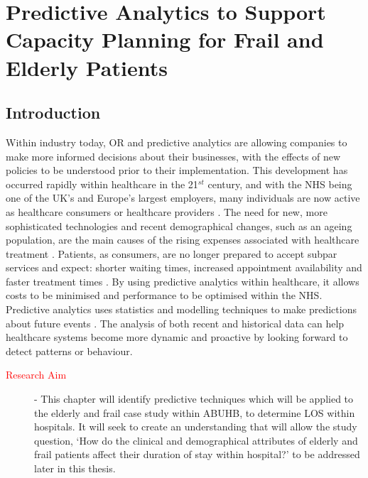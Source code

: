 \documentclass[../thesis.tex]{subfiles}
\begin{document}
\chapter{Predictive Analytics to Support Capacity Planning for Frail and Elderly Patients} \label{chp:predictive}

\section{Introduction}
Within industry today, OR and predictive analytics are allowing companies to make more informed decisions about their businesses, with the effects of new policies to be understood prior to their implementation. This development has occurred rapidly within healthcare in the 21$^{st}$ century, and with the NHS being one of the UK's and Europe's largest employers, many individuals are now active as healthcare consumers or healthcare providers \cite{NHSJobs2022}. The need for new, more sophisticated technologies and recent demographical changes, such as an ageing population, are the main causes of the rising expenses associated with healthcare treatment \cite{ONS2022}. Patients, as consumers, are no longer prepared to accept subpar services and expect: shorter waiting times, increased appointment availability and faster treatment times \cite{Aiken2021}. By using predictive analytics within healthcare, it allows costs to be minimised and performance to be optimised within the NHS. Predictive analytics uses statistics and modelling techniques to make predictions about future events \cite{Kumar2018}. The analysis of both recent and historical data can help healthcare systems become more dynamic and proactive by looking forward to detect patterns or behaviour.
\begin{description}

\item[\textcolor{red}{Research Aim}] - This chapter will identify predictive techniques which will be applied to the elderly and frail case study within ABUHB, to determine LOS within hospitals. It will seek to create an understanding that will allow the study question, `How do the clinical and demographical attributes of elderly and frail patients affect their duration of stay within hospital?' to be addressed later in this thesis. 
\end{description}
\end{document}
